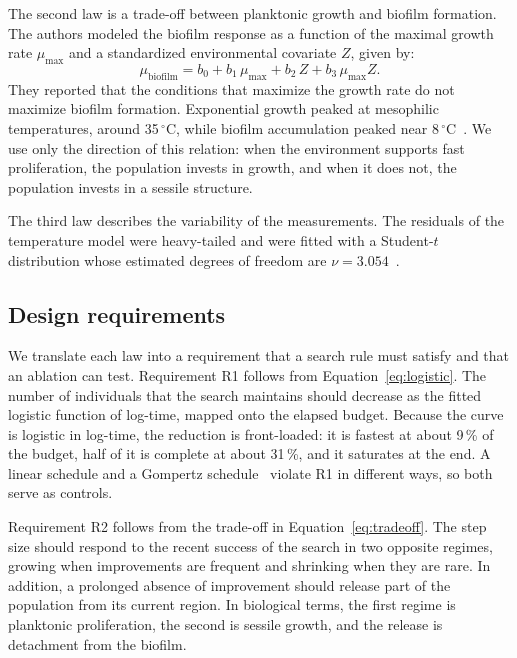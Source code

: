 \documentclass[preprint,12pt]{elsarticle}
\begin{document}
The second law is a trade-off between planktonic growth and biofilm formation.
The authors modeled the biofilm response as a function of the maximal growth
rate $\mu_{\max}$ and a standardized environmental covariate $Z$, given by:
\begin{equation}
  \mu_{\mathrm{biofilm}} = b_0 + b_1\,\mu_{\max} + b_2\,Z + b_3\,\mu_{\max} Z.
  \label{eq:tradeoff}
\end{equation}
They reported that the conditions that maximize the growth rate do not
maximize biofilm formation. Exponential growth peaked at mesophilic temperatures,
around 35\,$^\circ$C, while biofilm accumulation peaked near
8\,$^\circ$C~\cite{stehlik2025cobetia}. We use only the direction of this
relation: when the environment supports fast proliferation, the population
invests in growth, and when it does not, the population invests in a sessile
structure.

The third law describes the variability of the measurements. The residuals of
the temperature model were heavy-tailed and were fitted with a Student-$t$
distribution whose estimated degrees of freedom are
$\nu = 3.054$~\cite[Table~1]{stehlik2025cobetia}.

\subsection{Design requirements}
\label{sec:requirements}

We translate each law into a requirement that a search rule must satisfy and
that an ablation can test. Requirement R1 follows from Equation~\eqref{eq:logistic}.
The number of individuals that the search maintains should decrease as the
fitted logistic function of log-time, mapped onto the elapsed budget. Because
the curve is logistic in log-time, the reduction is front-loaded: it is fastest
at about 9\,\% of the budget, half of it is complete at about 31\,\%, and it
saturates at the end. A linear schedule and a
Gompertz schedule~\cite{zwietering1990growth} violate R1 in different ways,
so both serve as controls.

Requirement R2 follows from the trade-off in Equation~\eqref{eq:tradeoff}. The
step size should respond to the recent success of the search in two opposite
regimes, growing when improvements are frequent and shrinking when they are
rare. In addition, a prolonged absence of improvement should release part of
the population from its current region. In biological terms, the first regime is
planktonic proliferation, the second is sessile growth, and the release is
detachment from the biofilm.
\end{document}

